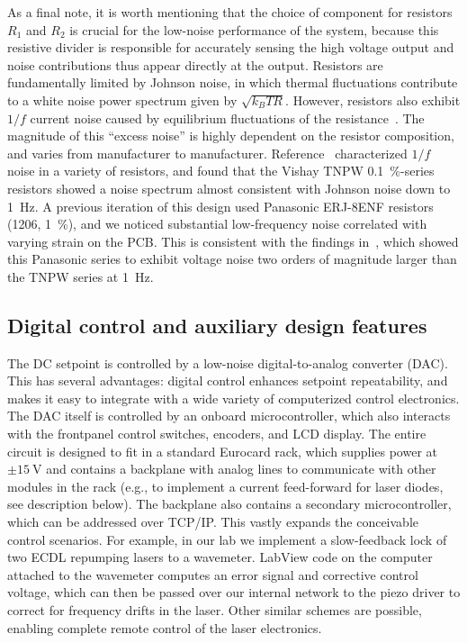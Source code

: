 \documentclass[aip,rsi,preprint,graphicx]{revtex4-1} %
\begin{document}
As a final note, it is worth mentioning that the choice of component for resistors $R_1$ and $R_2$ is crucial for the low-noise performance of the system, because this resistive divider is responsible for accurately sensing the high voltage output and noise contributions thus appear directly at the output.
Resistors are fundamentally limited by Johnson noise, in which thermal fluctuations contribute to a white noise power spectrum given by $\sqrt{k_B T R}$.
However, resistors also exhibit $1/f$ current noise caused by equilibrium fluctuations of the resistance~\cite{Clarke1974a,Voss1976a}.
The magnitude of this ``excess noise'' is highly dependent on the resistor composition, and varies from manufacturer to manufacturer.
Reference~\cite{Seifert2009a} characterized $1/f$ noise in a variety of resistors, and found that the Vishay TNPW \SI{0.1}{\percent}-series resistors showed a noise spectrum almost consistent with Johnson noise down to \SI{1}{\hertz}.
A previous iteration of this design used Panasonic ERJ-8ENF resistors (1206, \SI{1}{\percent}), and we noticed substantial low-frequency noise correlated with varying strain on the PCB.
This is consistent with the findings in~\cite{Seifert2009a}, which showed this Panasonic series to exhibit voltage noise two orders of magnitude larger than the TNPW series at \SI{1}{\hertz}.

\subsection{Digital control and auxiliary design features}
\label{Sec:DigControlAuxDesign}

The DC setpoint is controlled by a low-noise digital-to-analog converter (DAC).
This has several advantages: digital control enhances setpoint repeatability, and makes it easy to integrate with a wide variety of computerized control electronics.
The DAC itself is controlled by an onboard microcontroller, which also interacts with the frontpanel control switches, encoders, and LCD display.
The entire circuit is designed to fit in a standard Eurocard rack, which supplies power at $\pm\SI{15}{\volt}$ and contains a backplane with analog lines to communicate with other modules in the rack (e.g., to implement a current feed-forward for laser diodes, see description below).
The backplane also contains a secondary microcontroller, which can be addressed over TCP/IP.
This vastly expands the conceivable control scenarios. For example, in our lab we implement a slow-feedback lock of two ECDL repumping lasers to a wavemeter.
LabView code on the computer attached to the wavemeter computes an error signal and corrective control voltage, which can then be passed over our internal network to the piezo driver to correct for frequency drifts in the laser.
Other similar schemes are possible, enabling complete remote control of the laser electronics.
\end{document}
